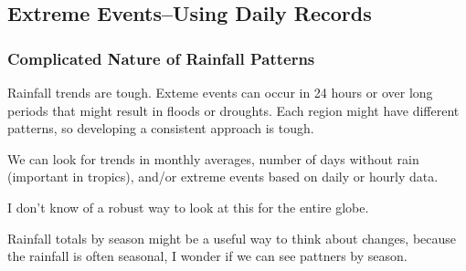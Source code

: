 \documentclass{article}
\begin{document}
\begin{knitrout}
\color{fgcolor}
\end{knitrout}


\subsection{Extreme Events--Using Daily Records}

\subsubsection{Complicated Nature of Rainfall Patterns}

Rainfall trends are tough. Exteme events can occur in 24 hours or over long periods that might result in floods or droughts. Each region might have different patterns, so developing a consistent approach is tough.

We can look for trends in monthly averages, number of days without rain (important in tropics), and/or extreme events based on daily or hourly data. 

I don't know of a robust way to look at this for the entire globe. 



Rainfall totals by season might be a useful way to think about changes, because the rainfall is often seasonal, I wonder if we can see pattners by season. 
\end{document}
